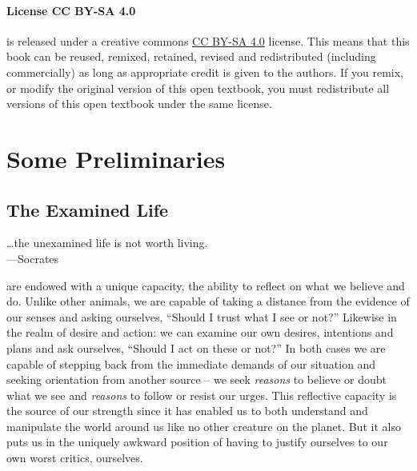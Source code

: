 \documentclass[justified]{tufte-book}
\newenvironment{epigraph}%
{
\begin{flushright}
\begin{minipage}{20em}
\begin{flushright}
\itshape
}%
{
\end{flushright}
\end{minipage}
\end{flushright}
}
\begin{document}
\hypertarget{license-cc-by-sa-4.0}{%
\subsection*{License CC BY-SA 4.0}\label{license-cc-by-sa-4.0}}

 is released under a creative commons \href{https://creativecommons.org/licenses/by-sa/4.0/}{CC BY-SA 4.0} license. This means that this book can be reused, remixed, retained, revised and redistributed (including commercially) as long as appropriate credit is given to the authors. If you remix, or modify the original version of this open textbook, you must redistribute all versions of this open textbook under the same license.

\hypertarget{part-some-preliminaries}{%
\part*{Some Preliminaries}\label{part-some-preliminaries}}

\hypertarget{the-examined-life}{%
\chapter{The Examined Life}\label{the-examined-life}}

\begin{epigraph}
\ldots{}the unexamined life is not worth living.\\
---Socrates
\end{epigraph}

 are endowed with a unique capacity, the ability to reflect on what we believe and do. Unlike other animals, we are capable of taking a distance from the evidence of our senses and asking ourselves, ``Should I trust what I see or not?'' Likewise in the realm of desire and action: we can examine our own desires, intentions and plans and ask ourselves, ``Should I act on these or not?'' In both cases we are capable of stepping back from the immediate demands of our situation and seeking orientation from another source -- we seek \emph{reasons} to believe or doubt what we see and \emph{reasons} to follow or resist our urges. This reflective capacity is the source of our strength since it has enabled us to both understand and manipulate the world around us like no other creature on the planet. But it also puts us in the uniquely awkward position of having to justify ourselves to our own worst critics, ourselves.
\end{document}

